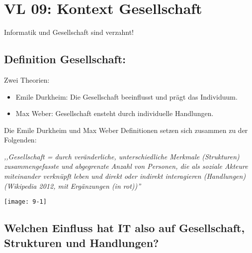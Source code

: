 \section{VL 09: Kontext Gesellschaft}
Informatik und Gesellschaft sind verzahnt!

\subsection{Definition Gesellschaft:}
Zwei Theorien:
\begin{itemize}
	\item Emile Durkheim:
	Die Gesellschaft beeinflusst und prägt das Individuum. 
	\item Max Weber:
	Gesellschaft ensteht durch individuelle Handlungen.
\end{itemize}
Die Emile Durkheim und Max Weber Definitionen setzen sich zusammen zu der Folgenden:

\emph{,,Gesellschaft = durch veränderliche, unterschiedliche Merkmale (Strukturen)
zusammengefasste und abgegrenzte Anzahl von Personen, die als soziale
Akteure miteinander verknüpft leben und direkt oder indirekt interagieren
(Handlungen) (Wikipedia 2012, mit Ergänzungen (in rot))''}


\texttt{[image: 9-1]}

\subsection{Welchen Einfluss hat IT also auf Gesellschaft, Strukturen und Handlungen?}

